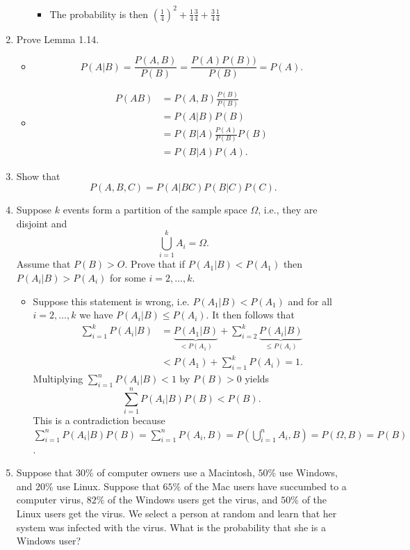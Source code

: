 \documentclass{article}
\begin{document}
\begin{enumerate}
\begin{enumerate}
\begin{itemize}
					\item The probability is then $\left(\frac{1}{4}\right)^2 + \frac{1}{4} \frac{3}{4} + \frac{3}{4}\frac{1}{4}$
				\end{itemize}
		\end{enumerate}
	\item Prove Lemma 1.14.
		\begin{itemize}
			\item
			$$
			P(A|B) = \frac{P(A, B)}{P(B)} = \frac{P(A)P(B))}{P(B)} = P(A).
			$$
			\item
			$$
			\begin{aligned}
			P(AB) &= P(A, B) \frac{P(B)}{P(B)} \\
			&= P(A|B) P(B) \\
			& = P(B|A) \frac{P(A)}{P(B)} P(B) \\
			&= P(B|A)P(A).
			\end{aligned}
			$$
		\end{itemize}
	\item Show that
	$$
	P(A, B, C) = P(A|BC)P(B|C)P(C).
	$$
	\item Suppose $k$ events form a partition of the sample space $\Omega$, i.e., they are disjoint and 
	$$
	\bigcup_{i = 1}^k A_i = \Omega.
	$$
	Assume that $P(B) > O$. Prove that if $P(A_1|B) < P(A_1)$ then $P(A_i|B) > P(A_i)$ for some $i = 2, \dots, k$.
		\begin{itemize}
			\item Suppose this statement is wrong, i.e. $P(A_1|B) < P(A_1)$ and for all $i = 2, \dots, k$ we have $P(A_i|B) \leq P(A_i)$. It then follows that
			$$
			\begin{aligned}
			\sum_{i = 1}^k P(A_i|B) &= \underbrace{P(A_1|B)}_{< P(A_1)} + \sum_{i = 2}^k \underbrace{P(A_i|B)}_{\leq P(A_i)} \\
			&< P(A_1) + \sum_{i = 1}^k P(A_i) = 1.
			\end{aligned}
			$$
			Multiplying $\sum_{i = 1}^n P(A_i|B) < 1$ by $P(B) > 0$ yields
			$$
			\sum_{i = 1}^n P(A_i|B)P(B) < P(B).
			$$
			This is a contradiction because $\sum_{i = 1}^n P(A_i|B)P(B) = \sum_{i = 1}^n P(A_i, B) = P\left(\bigcup_{i = 1}^n A_i , B\right) = P(\Omega, B) = P(B)$.
		\end{itemize}
	\item Suppose that $30\%$ of computer owners use a Macintosh, $50\%$ use Windows, and $20\%$ use Linux. Suppose that $65\%$ of the Mac users have succumbed to a computer virus, $82\%$ of the Windows users get the virus, and $50\%$ of the Linux users get the virus. We select a person at random and learn that her system was infected with the virus. What is the probability that she is a Windows user?

\end{enumerate}
\end{document}
